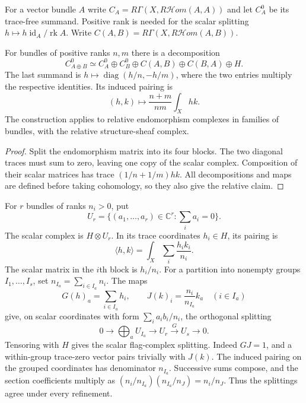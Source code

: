 For a vector bundle $A$ write
$C_A=R\Gamma(X,R\mathcal Hom(A,A))$ and let $C_A^0$ be its
trace-free summand. Positive rank is needed for the scalar
splitting $h\mapsto h\operatorname{id}_A/\operatorname{rk}A$.
Write $C(A,B)=R\Gamma(X,R\mathcal Hom(A,B))$.

\begin{proposition}\label{cycompact:prop:trace-split}
For bundles of positive ranks $n,m$ there is a decomposition
\begin{equation}\label{cycompact:eq:trace-split}
 C_{A\oplus B}^0\simeq
 C_A^0\oplus C_B^0\oplus C(A,B)\oplus C(B,A)\oplus H.
\end{equation}
The last summand is
$h\mapsto\operatorname{diag}(h/n,-h/m)$, where the two entries
multiply the respective identities. Its induced pairing is
\[
 (h,k)\longmapsto\frac{n+m}{nm}\int_Xhk.
\]
The construction applies to relative endomorphism complexes in
families of bundles, with the relative structure-sheaf complex.
\end{proposition}

\begin{proof}
Split the endomorphism matrix into its four blocks. The two
diagonal traces must sum to zero, leaving one copy of the
scalar complex. Composition of their scalar matrices has
trace $(1/n+1/m)hk$. All decompositions and maps are defined
before taking cohomology, so they also give the relative claim.
\end{proof}

For $r$ bundles of ranks $n_i>0$, put
\[
 U_r=\{(a_1,\ldots,a_r)\in\mathbb C^r:
                 \textstyle\sum_i a_i=0\}.
\]
The scalar complex is $H\otimes U_r$. In its trace
coordinates $h_i\in H$, its pairing is
\[
 \langle h,k\rangle=\int_X\sum_i\frac{h_ik_i}{n_i}.
\]
The scalar matrix in the $i$th block is $h_i/n_i$. For a
partition into nonempty groups $I_1,\ldots,I_s$, set
$n_{I_a}=\sum_{i\in I_a}n_i$. The maps
\begin{equation}\label{cycompact:eq:trace-grouping}
 G(h)_a=\sum_{i\in I_a}h_i,\qquad
 J(k)_i=\frac{n_i}{n_{I_a}}k_a\quad(i\in I_a)
\end{equation}
give, on scalar coordinates with form
$\sum_i a_ib_i/n_i$, the orthogonal splitting
\[
 0\longrightarrow\bigoplus_aU_{I_a}
 \longrightarrow U_r\xrightarrow{G}U_s\longrightarrow0.
\]
Tensoring with $H$ gives the scalar flag-complex splitting.
Indeed $GJ=1$, and a within-group trace-zero vector pairs
trivially with $J(k)$. The induced pairing on the grouped
coordinates has denominator $n_{I_a}$. Successive sums compose,
and the section coefficients multiply as
$(n_i/n_{I_a})(n_{I_a}/n_J)=n_i/n_J$.
Thus the splittings agree under every refinement.

